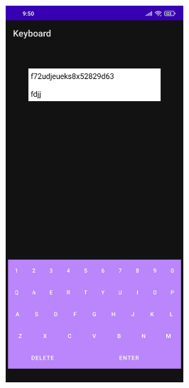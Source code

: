 \documentclass[12pt,letterpaper]{article}
\begin{document}
\begin{figure}
    \centering
    \includegraphics[height=14cm, keepaspectratio]{Keyboard/Outputs/OP3.jpeg}
\end{figure}
\end{document}
